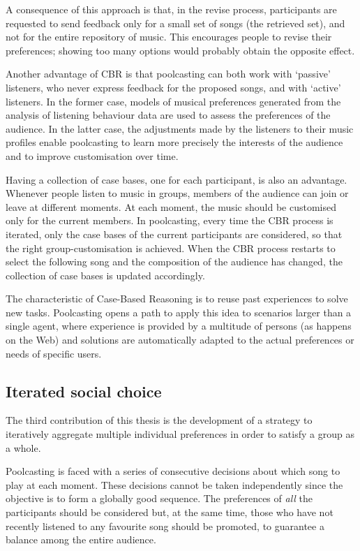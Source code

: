 A consequence of this approach is that, in the revise process, participants are requested to send feedback only for a small set of songs (the retrieved set), and not for the entire repository of music.
This encourages people to revise their preferences; showing too many options would probably obtain the opposite effect.

Another advantage of CBR is that poolcasting can both work with `passive' listeners, who never express feedback for the proposed songs, and with `active' listeners.
In the former case, models of musical preferences generated from the analysis of listening behaviour data are used to assess the preferences of the audience.
In the latter case, the adjustments made by the listeners to their music profiles enable poolcasting to learn more precisely the interests of the audience and to improve customisation over time.

Having a collection of case bases, one for each participant, is also an advantage.
Whenever people listen to music in groups, members of the audience can join or leave at different moments. At each moment, the music should be customised only for the current members.
In poolcasting, every time the CBR process is iterated, only the case bases of the current participants are considered, so that the right group-customisation is achieved. When the CBR process restarts to select the following song and the composition of the audience has changed, the collection of case bases is updated accordingly.

The characteristic of Case-Based Reasoning is to reuse past experiences to solve new tasks.
Poolcasting opens a path to apply this idea to scenarios larger than a single agent, where experience is provided by a multitude of persons (as happens on the Web) and solutions are automatically adapted to the actual preferences or needs of specific users.


\subsection{Iterated social choice} %
\label{sec:iterated_social_choice}

The third contribution of this thesis is the development of a strategy to iteratively aggregate multiple individual preferences in order to satisfy a group as a whole.

Poolcasting is faced with a series of consecutive decisions about which song to play at each moment.
These decisions cannot be taken independently since the objective is to form a globally good sequence.
The preferences of \emph{all} the participants should be considered but, at the same time, those who have not recently listened to any favourite song should be promoted, to guarantee a balance among the entire audience.

